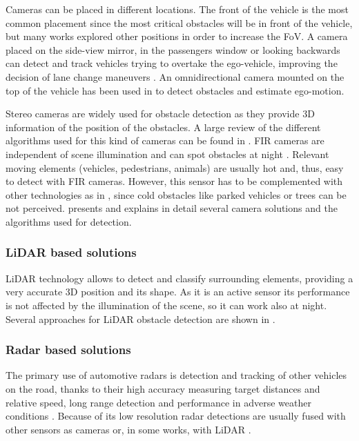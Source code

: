Cameras can be placed in different locations. The front of the vehicle is 
the most common placement since the most critical obstacles will be in front of 
the vehicle, but many works explored other positions in order to increase the
FoV. 
A camera placed on the side-view mirror, in the 
passengers window \cite{chang2008real} or looking backwards \cite{liu2007rear}
can detect and track vehicles trying to overtake the ego-vehicle, 
improving the decision of lane change maneuvers \cite{alonso2008lane, 
song2007lateral, blanc2007larasidecam}. 
An omnidirectional camera mounted
on the top of the vehicle has been used in \cite{gandhi2006vehicle}
to detect obstacles and estimate ego-motion.

Stereo cameras are widely used for obstacle detection as they provide 3D 
information of the position of the obstacles. A large review of the different 
algorithms used for this kind of cameras can be found in \cite{bernini2014real}.
FIR cameras are independent of scene illumination and can spot obstacles at
night \cite{olmeda2013pedestrian}. Relevant moving elements (vehicles, 
pedestrians, animals) are usually hot and, thus, easy to detect with FIR 
cameras. However, this sensor has to be complemented with other technologies
as in \cite{krotosky2007color}, since cold obstacles like parked vehicles or
trees can be not perceived.
\cite{sivaraman2013looking} presents and explains in detail several camera
solutions and the algorithms used for detection.

\subsubsection{LiDAR based solutions}
LiDAR technology allows to detect and classify surrounding elements, providing
a very accurate 3D position and its shape. 
As it is an active sensor its performance is not affected by the illumination 
of the scene, so it can work also at night. Several approaches for LiDAR 
obstacle detection are shown in \cite{li2016vehicle}.

\subsubsection{Radar based solutions}
The primary use of automotive radars is detection and tracking of other 
vehicles on the road, thanks to their high accuracy measuring target 
distances and relative speed, long range detection and performance in adverse 
weather conditions \cite{blanc2004obstacle}. 
Because of its low resolution radar detections are
usually fused with other sensors as cameras \cite{garcia2012data} or, in some
works, with LiDAR \cite{gohring2011radar}.

